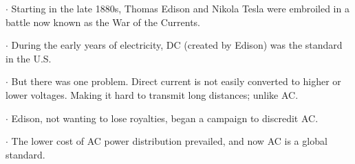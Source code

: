 \documentclass[preview]{standalone}
\begin{document}
\centering \begin{flushleft} $\cdot$ Starting in the late 1880s, Thomas Edison and Nikola Tesla were embroiled in a battle now known as the War of the Currents.\end{flushleft} \begin{flushleft} $\cdot$ During the early years of electricity, DC (created by Edison) was the standard in the U.S.\end{flushleft} \begin{flushleft} $\cdot$ But there was one problem. Direct current is not easily converted to higher or lower voltages. Making it hard to transmit long distances; unlike AC.\end{flushleft} \begin{flushleft} $\cdot$ Edison, not wanting to lose royalties, began a campaign to discredit AC.\end{flushleft} \begin{flushleft} $\cdot$ The lower cost of AC power distribution prevailed, and now AC is a global standard.\end{flushleft}
\end{document}
